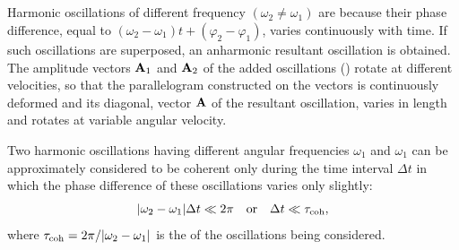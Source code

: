 \subsection{}\label{28.4.4} Harmonic oscillations of different frequency $(\omega_{2} \neq \omega_{1})$ are  because their phase difference, equal to $(\omega_{2} - \omega_{1})t + (\varphi_{2} - \varphi_{1})$, varies continuously with time. If such oscillations are superposed, an anharmonic resultant oscillation is obtained. The amplitude vectors $\vb{A}_{1}$ and $\vb{A}_{2}$ of the added oscillations () rotate at different velocities, so that the parallelogram constructed on the vectors is continuously deformed and its diagonal, vector $\vb{A}$ of the resultant oscillation, varies in length and rotates at variable angular velocity. 

Two harmonic oscillations having different angular frequencies $\omega_{1}$ and $\omega_{1}$ can be approximately considered to be coherent only during the time interval $\Delta t$ in which the phase difference of these oscillations varies only slightly: 
\begin{equation*}%
\abs{\omega_{2} - \omega_{1}} \Delta t \ll 2 \pi \qor \Delta t \ll \tau_{\textrm{coh}},
\end{equation*}
where $\tau_{\textrm{coh}} = 2\pi/\abs{\omega_{2} - \omega_{1}}$ is the  of the oscillations being considered.

